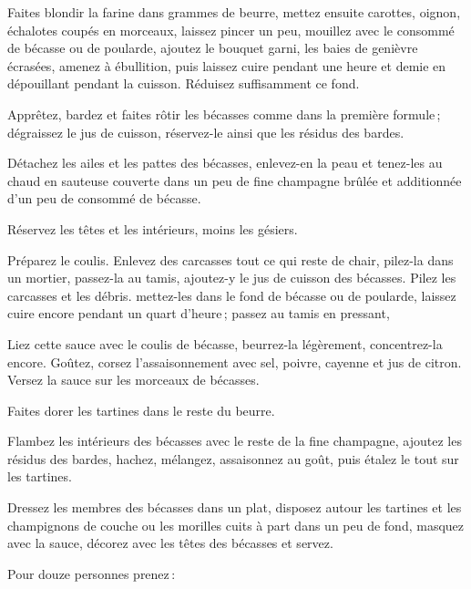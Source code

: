 Faites blondir la farine dans {\mmm} grammes de beurre, mettez ensuite
carottes, oignon, échalotes coupés en morceaux, laissez pincer un peu, mouillez
avec le consommé de bécasse ou de poularde, ajoutez le bouquet garni, les baies
de genièvre écrasées, amenez à ébullition, puis laissez cuire pendant une heure
et demie en dépouillant pendant la cuisson. Réduisez suffisamment ce fond.

Apprêtez, bardez et faites rôtir les bécasses comme dans la première formule ;
dégraissez le jus de cuisson, réservez-le ainsi que les résidus des bardes.

Détachez les ailes et les pattes des bécasses, enlevez-en la peau et tenez-les au
chaud en sauteuse couverte dans un peu de fine champagne brûlée et additionnée
d'un peu de consommé de bécasse.

Réservez les têtes et les intérieurs, moins les gésiers.

Préparez le coulis. Enlevez des carcasses tout ce qui reste de chair, pilez-la
dans un mortier, passez-la au tamis, ajoutez-y le jus de cuisson des bécasses.
Pilez les carcasses et les débris. mettez-les dans le fond de bécasse ou de
poularde, laissez cuire encore pendant un quart d'heure ; passez au tamis en
pressant,

Liez cette sauce avec le coulis de bécasse, beurrez-la légèrement,
concentrez-la encore. Goûtez, corsez l'assaisonnement avec sel, poivre, cayenne
et jus de citron. Versez la sauce sur les morceaux de bécasses.

Faites dorer les tartines dans le reste du beurre.

Flambez les intérieurs des bécasses avec le reste de la fine champagne, ajoutez
les résidus des bardes, hachez, mélangez, assaisonnez au goût, puis étalez le
tout sur les tartines.

Dressez les membres des bécasses dans un plat, disposez autour les tartines et
les champignons de couche ou les morilles cuits à part dans un peu de fond,
masquez avec la sauce, décorez avec les têtes des bécasses et servez.

\begin{center}
\small{}
\end{center}

Pour douze personnes prenez :

\smallskip

